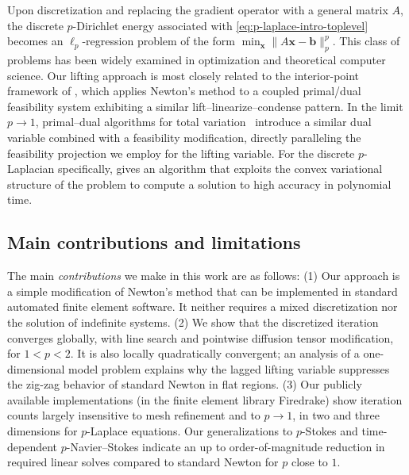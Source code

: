 \documentclass[11pt,pdflatex,sn-mathphys-num]{sn-jnl}
\theoremstyle{thmstyleone}%
\theoremstyle{thmstyletwo}%
\theoremstyle{thmstylethree}%
\newcommand{\bs}[1]{\ensuremath{\boldsymbol{#1}}}
\begin{document}
Upon discretization and replacing the gradient operator with a general matrix $A$, the discrete $p$-Dirichlet energy associated with \eqref{eq:p-laplace-intro-toplevel} becomes an $\ell_p$-regression problem of the form $\min_{\bs x} \|A\bs x - \bs b\|_p^p$. 
This class of problems has been widely examined in optimization and theoretical computer science. Our lifting approach is most closely related to the interior-point framework of \cite{andersen2000primaldual}, which applies Newton's method to a coupled primal/dual feasibility system exhibiting a similar lift--linearize--condense pattern. In the limit $p \to 1$, primal--dual algorithms for total variation~\cite{chan1999nonlinear,HintermullerStadler06} introduce a similar dual variable combined with a feasibility modification, directly paralleling the feasibility projection we employ for the lifting variable. For the discrete $p$-Laplacian specifically, \cite{Loisel20} gives an algorithm that exploits the convex variational structure of the problem to compute a solution to high accuracy in polynomial time.


\subsection{Main contributions and limitations}
The main \emph{contributions} we make in this work are as follows: 
(1) Our approach is a simple modification of Newton's method that can be implemented in standard automated finite element software. It neither requires a mixed discretization nor the solution of indefinite systems.
(2) We show that the discretized iteration converges globally, with line search and pointwise diffusion tensor modification, for $1<p<2$. It is also locally quadratically convergent; 
an analysis of a one-dimensional model problem explains why the lagged lifting variable suppresses the zig-zag behavior of standard Newton in flat regions.
(3) Our publicly available implementations (in the finite element library Firedrake) show iteration counts largely insensitive to mesh refinement and to $p\to1$, in two and three dimensions for $p$-Laplace equations. Our generalizations to $p$-Stokes and time-dependent $p$-Navier--Stokes indicate an up to order-of-magnitude reduction in required linear solves compared to standard Newton for $p$ close to $1$.
\end{document}
